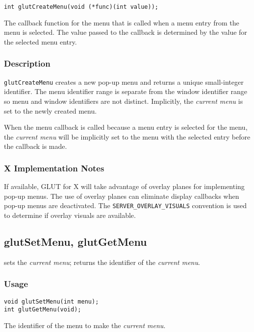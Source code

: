 \begin{verbatim}
int glutCreateMenu(void (*func)(int value));
\end{verbatim}
\begin{description}
\itemsep 0in
\item[\tt func]
The callback function for the menu that is called when a menu
entry from the menu is selected.  The value passed to the callback
is determined by the value for the selected menu entry.
\end{description}

\subsubsection*{Description}

{\tt glutCreateMenu} creates a new pop-up menu and returns a unique small-integer
identifier.  The menu identifier range is separate from the window identifier range
so menu and window identifiers are not distinct.
Implicitly, the {\em current menu} is set to the newly created menu.

When the menu callback is called because a menu entry is selected for
the menu, the {\em current menu} will be implicitly set to the menu
with the selected entry before the callback is made.

\subsubsection*{X Implementation Notes}

If available, GLUT for X will take advantage of overlay planes
for implementing pop-up menus.  The use of overlay planes can
eliminate display callbacks when pop-up menus are deactivated.
The {\tt SERVER\_OVERLAY\_VISUALS} convention \cite{kilgard93} is used to
determine if overlay visuals are available.

\subsection{glutSetMenu, glutGetMenu}

 sets the {\em current menu};  returns the
identifier of the {\em current menu}.

\subsubsection*{Usage}

\begin{verbatim}
void glutSetMenu(int menu);
int glutGetMenu(void);
\end{verbatim}
\begin{description}
\itemsep 0in
\item[\tt menu]
The identifier of the menu to make the {\em current menu}.
\end{description}

